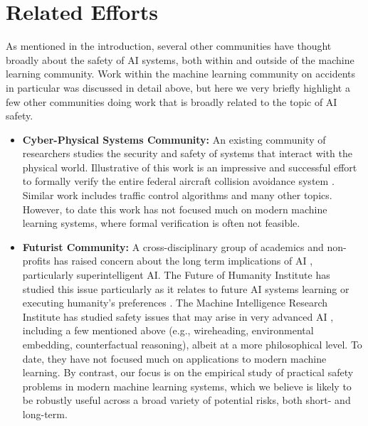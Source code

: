 \documentclass[a4paper,10pt]{article}
\begin{document}
\section{Related Efforts}\label{related}
As mentioned in the introduction, several other communities have thought broadly about the safety of AI systems, both within and outside of the machine learning community.  Work within the machine learning community on accidents in particular was discussed in detail above, but here we very briefly highlight a few other communities doing work that is broadly related to the topic of AI safety.

\begin{itemize}
\item {\bf Cyber-Physical Systems Community:}  An existing community of researchers studies the security and safety of systems that interact with the physical world.  Illustrative of this work is an impressive and successful effort to formally verify the entire federal aircraft collision avoidance system \cite{jeannin2015formally,loos2013formal}.  Similar work includes traffic control algorithms \cite{mitsch2012towards} and many other topics.  However, to date this work has not focused much on modern machine learning systems, where formal verification is often not feasible.

\item {\bf Futurist Community:} A cross-disciplinary group of academics and non-profits has raised concern about the long term implications of AI \cite{bostrom2014superintelligence,yudkowsky2008artificial}, particularly superintelligent AI. The Future of Humanity Institute has studied this issue particularly as it relates to future AI systems learning or executing humanity’s preferences \cite{evans2015learning,dewey2014reinforcement,armstrong2010utility,armstrong2015motivated}. The Machine Intelligence Research Institute has studied safety issues that may arise in very advanced AI \cite{garrabrant2016uniform,garrabrant2016asymptotic,critch2016parametric,taylor2016quantilizers,soares2015toward}, including a few mentioned above (e.g., wireheading, environmental embedding, counterfactual reasoning), albeit at a more philosophical level. To date, they have not focused much on applications to modern machine learning.  By contrast, our focus is on the empirical study of practical safety problems in modern machine learning systems, which we believe is likely to be robustly useful across a broad variety of potential risks, both short- and long-term.


\end{itemize}
\end{document}
